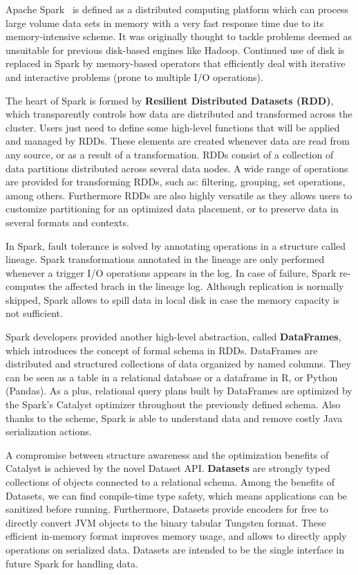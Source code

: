 \documentclass[3p,review]{elsarticle}
\begin{document}
Apache Spark~\cite{hamstra15} is defined as a distributed computing platform which can process large volume data sets in memory with a very fast response time due to its memory-intensive scheme. It was originally thought to tackle problems deemed as unsuitable for previous disk-based engines like Hadoop. Continued use of disk is replaced in Spark by memory-based operators that efficiently deal with iterative and interactive problems (prone to multiple I/O operations). 

The heart of Spark is formed by \textbf{Resilient Distributed Datasets (RDD)}, which transparently controls how data are distributed and transformed across the cluster. Users just need to define some high-level functions that will be applied and managed by RDDs. These elements are created whenever data are read from any source, or as a result of a transformation. RDDs consist of a collection of data partitions distributed across several data nodes. A wide range of operations are provided for transforming RDDs, such as: filtering, grouping, set operations, among others. Furthermore RDDs are also highly versatile as they allows users to customize partitioning for an optimized data placement, or to preserve data in several formats and contexts.

In Spark, fault tolerance is solved by annotating operations in a structure called lineage. Spark transformations annotated in the lineage are only performed whenever a trigger I/O operations appears in the log. In case of failure, Spark re-computes the affected brach in the lineage log. Although replication is normally skipped, Spark allows to spill data in local disk in case the memory capacity is not sufficient. 

Spark developers provided another high-level abstraction, called \textbf{DataFrames}, which introduces the concept of formal schema in RDDs. DataFrames are distributed and structured collections of data organized by named columns. They can be seen as a table in a relational database or a dataframe in R, or Python (Pandas). As a plus, relational query plans built by DataFrames are optimized by the Spark's Catalyst optimizer throughout the previously defined schema. Also thanks to the scheme, Spark is able to understand data and remove costly Java serialization actions.

A compromise between structure awareness and the optimization benefits of Catalyst is achieved by the novel Dataset API. \textbf{Datasets} are strongly typed collections of objects connected to a relational schema. Among the benefits of Datasets, we can find compile-time type safety, which means applications can be sanitized before running. Furthermore, Datasets provide encoders for free to directly convert JVM objects to the binary tabular Tungsten format. These efficient in-memory format improves memory usage, and allows to directly apply operations on serialized data. Datasets are intended to be the single interface in future Spark for handling data.
\end{document}
